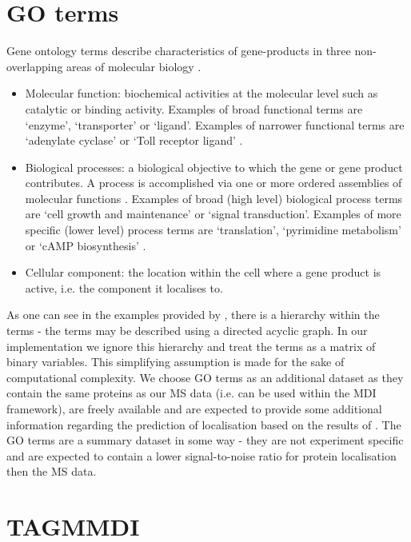 \documentclass[11pt]{article} %
\begin{document}
\section{GO terms}
Gene ontology terms describe characteristics of gene-products in three non-overlapping areas of molecular biology \cite{GeneOntologyConsortiumGeneOntologyGO2004}.

\begin{itemize}
 \item Molecular function: biochemical activities at the molecular level such as catalytic or binding activity. Examples of broad functional terms are ‘enzyme’, ‘transporter’ or ‘ligand’. Examples of narrower functional terms are ‘adenylate cyclase’ or ‘Toll receptor ligand’ \cite{AshburnerGeneOntologytool2000}.
 \item Biological processes: a biological objective to which the gene or gene product contributes. A process is accomplished via one or more ordered assemblies of molecular functions \cite{AshburnerGeneOntologytool2000}. Examples of broad (high level) biological process terms are ‘cell growth and maintenance’ or ‘signal transduction’. Examples of more specific (lower level) process terms are ‘translation’, ‘pyrimidine metabolism’ or ‘cAMP biosynthesis’ \cite{AshburnerGeneOntologytool2000}.
 \item Cellular component: the location within the cell where a gene product is active, i.e. the component it localises to.
\end{itemize}
As one can see in the examples provided by \citet{AshburnerGeneOntologytool2000}, there is a hierarchy within the terms - the terms may be described using a directed acyclic graph. In our implementation we ignore this hierarchy and treat the terms as a matrix of binary variables. This simplifying assumption is made for the sake of computational complexity. We choose GO terms as an additional dataset as they contain the same proteins as our MS data (i.e. can be used within the MDI framework), are freely available and are expected to provide some additional information regarding the prediction of localisation based on the results of \citet{BreckelsLearningHeterogeneousData2016a}. The GO terms are a summary dataset in some way - they are not experiment specific and are expected to contain a lower signal-to-noise ratio for protein localisation then the MS data.

\section{TAGMMDI}
\end{document}
